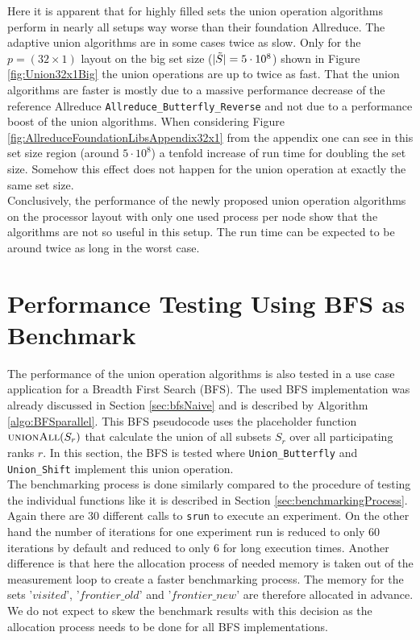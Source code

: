 Here it is apparent that for highly filled sets the union operation algorithms perform in nearly all setups way worse than their foundation Allreduce. 
The adaptive union algorithms are in some cases twice as slow. Only for the $p=(32\times1)$ layout on the big set size ($|\Tilde{S}|=5\cdot10^8$) shown in Figure \ref{fig:Union32x1Big} the union operations are up to twice as fast. That the union algorithms are faster is mostly due to a massive performance decrease of the reference Allreduce \texttt{All\-re\-duce\_But\-ter\-fly\_Reverse} and not due to a performance boost of the union algorithms. When considering Figure \ref{fig:AllreduceFoundationLibsAppendix32x1} from the appendix one can see in this set size region (around $5\cdot10^8$) a tenfold increase of run time for doubling the set size. Somehow this effect does not happen for the union operation at exactly the same set size.\\
Conclusively, the performance of the newly proposed union operation algorithms on the processor layout with only one used process per node show that the algorithms are not so useful in this setup. The run time can be expected to be around twice as long in the worst case.


\section{Performance Testing Using BFS as Benchmark}
The performance of the union operation algorithms is also tested in a use case application for a Breadth First Search (BFS). The used BFS implementation was already discussed in Section \ref{sec:bfsNaive}  and is described by Algorithm \ref{algo:BFSparallel}. This BFS pseudocode uses the placeholder function $\Call{unionAll}{S_r}$ that calculate the union of all subsets $S_r$ over all participating ranks $r$. In this section, the BFS is tested where \texttt{Union\_Butterfly} and \texttt{Union\_Shift} implement this union operation.\\
The benchmarking process is done similarly compared to the procedure of testing the individual functions like it is described in Section \ref{sec:benchmarkingProcess}. Again there are 30 different calls to \texttt{srun} to execute an experiment. On the other hand the number of iterations for one experiment run is reduced to only 60 iterations by default and reduced to only 6 for long execution times. Another difference is that here the allocation process of needed memory is taken out of the measurement loop to create a faster benchmarking process. The memory for the sets '$visited$', '$frontier\_old$' and '$frontier\_new$' are therefore allocated in advance. We do not expect to skew the benchmark results with this decision as the allocation process needs to be done for all BFS implementations.


